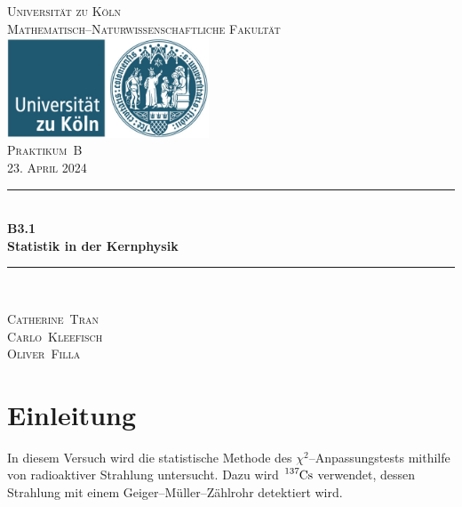 \documentclass[12pt,a4paper]{scrartcl}
\numberwithin{equation}{section} %
\newcommand{\HRule}{\rule{\linewidth}{0.7mm}}
\begin{document}
\begin{titlepage}
	\pagestyle{empty}

	\begin{center}

	\textsc{\LARGE Universität zu Köln }\\ [0.4cm]
	\textsc{Mathematisch--Naturwissenschaftliche Fakultät} \\[1.5cm]

	\includegraphics[width=0.45\textwidth]{../media/uni.jpg}\\[1.5cm]  %

	\textsc{\Large Praktikum~B}\\[2mm]
	\textsc{23. April 2024}\\[10mm]
	\HRule \\[0.4cm]

		{	\Huge \bfseries B3.1}\\[0.4cm]
			{	\huge \bfseries Statistik in der Kernphysik}\\[0.3cm]
	
	\HRule \\[3cm]

 	\begin{center}
		\textsc{\Large Catherine~Tran } \\[3pt]
		\textsc{\Large Carlo~Kleefisch } \\[3pt]
		\textsc{\Large Oliver~Filla } \\[3pt]
	\end{center}
	\end{center}
\end{titlepage}

\newpage
\tableofcontents
\newpage

\hypertarget{einleitung}{%
\section{Einleitung}\label{einleitung}}

In diesem Versuch wird die statistische Methode des \(\chi^2\)--Anpassungstests mithilfe von radioaktiver Strahlung untersucht. Dazu wird \(\ce{^{137}Cs}\) verwendet, dessen Strahlung mit einem Geiger--Müller--Zählrohr detektiert wird.
\end{document}

